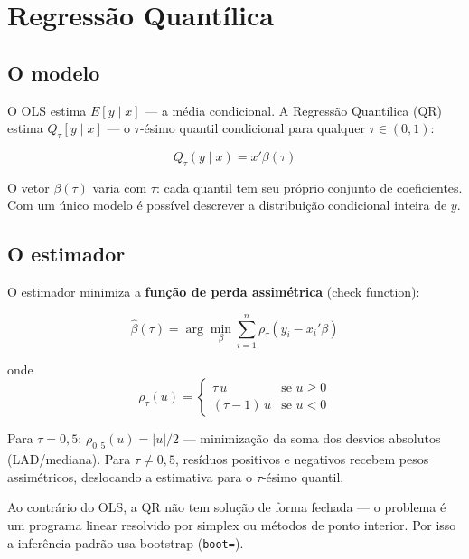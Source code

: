 \chapter{Regressão Quantílica}
\label{cap:qreg}

\section{O modelo}

O OLS estima $E[y \mid x]$ — a média condicional. A Regressão Quantílica
(QR) estima $Q_\tau[y \mid x]$ — o $\tau$-ésimo quantil condicional para
qualquer $\tau \in (0,1)$:

\[
  Q_\tau(y \mid x) = x'\beta(\tau)
\]

O vetor $\beta(\tau)$ varia com $\tau$: cada quantil tem seu próprio conjunto
de coeficientes. Com um único modelo é possível descrever a distribuição
condicional inteira de $y$.

\section{O estimador}

O estimador minimiza a \textbf{função de perda assimétrica} (check function):

\[
  \hat\beta(\tau) = \arg\min_\beta \sum_{i=1}^{n} \rho_\tau(y_i - x_i'\beta)
\]

onde
\[
  \rho_\tau(u) =
  \begin{cases}
    \tau\, u       & \text{se } u \geq 0 \\
    (\tau - 1)\,u  & \text{se } u < 0
  \end{cases}
\]

Para $\tau = 0{,}5$: $\rho_{0,5}(u) = |u|/2$ — minimização da soma dos
desvios absolutos (LAD/mediana). Para $\tau \neq 0{,}5$, resíduos positivos
e negativos recebem pesos assimétricos, deslocando a estimativa para o
$\tau$-ésimo quantil.

\begin{nota}
  Ao contrário do OLS, a QR não tem solução de forma fechada — o problema
  é um programa linear resolvido por simplex ou métodos de ponto interior.
  Por isso a inferência padrão usa bootstrap (\lstinline{boot=}).
\end{nota}

